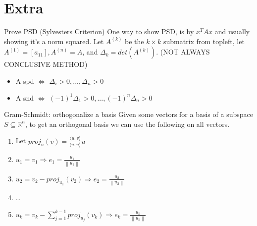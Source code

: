 \documentclass[a4paper]{article}
\begin{document}
\section{Extra}
\begin{subbox}{Prove PSD (Sylvesters Criterion)}
    One way to show PSD, is by $x^TAx$ and usually showing it's a norm squared.
    Let $A^{(k)}$ be the $k\times k$ submatrix from topleft, let $A^{(1)} = [a_{11}], A^{(n)} = A$, and $\Delta_k = det(A^{(k)})$. (NOT ALWAYS CONCLUSIVE METHOD)  
    \begin{itemize}
        \item A spd $\Leftrightarrow$ $\Delta_i > 0, ..., \Delta_n > 0$
        \item A snd $\Leftrightarrow$ $(-1)^1 \Delta_1 > 0, ..., (-1)^n \Delta_n > 0$  
    \end{itemize}
\end{subbox}
\begin{mainbox}{Gram-Schmidt: orthogonalize a basis}
    Given some vectors for a basis of a subspace $S\subseteq \mathbb{R}^n$, to get an orthogonal basis we can use the following on all vectors. 
 \begin{enumerate}
    \item Let $proj_u(v) = \frac{\langle u, v \rangle}{\langle u, u\rangle}u$ 
    \item $u_1 = v_1 \Rightarrow e_1 = \frac{u_1}{\left\lVert u_1\right\rVert } $
    \item $u_2 = v_2 - proj_{u_1}(v_2) \Rightarrow e_2 = \frac{u_2}{\left\lVert u_2\right\rVert }$
    \item \dots
    \item $u_k = v_k - \sum_{j=1}^{k-1}proj_{u_j}(v_k) \Rightarrow e_k = \frac{u_k}{\left\lVert u_k\right\rVert }$ 
 \end{enumerate}
 
\end{mainbox}
\end{document}
